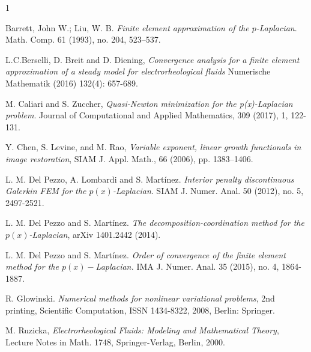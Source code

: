 \documentclass[11pt]{amsart}
\theoremstyle{remark}
\theoremstyle{definition}
\numberwithin{equation}{section}
\begin{document}
\begin{thebibliography}{1}

 {\sc Barrett, John W.; Liu, W. B}. \emph{Finite element approximation of the $p$-Laplacian}. Math. Comp. 61 (1993), no. 204, 523--537.

 {\sc L.C.Berselli, D. Breit and D. Diening}, \emph{Convergence analysis for a finite element approximation of a steady model for electrorheological fluids}
Numerische Mathematik  (2016) 132(4): 657-689.

 {\sc M. Caliari and S. Zuccher}, \emph{Quasi-Newton minimization for the p(x)-Laplacian problem}. Journal of Computational and Applied Mathematics, 309 (2017), 1, 122-131.

 {\sc Y. Chen, S. Levine, and M. Rao}, \emph{Variable exponent, linear growth functionals in image
restoration}, SIAM J. Appl. Math., 66 (2006), pp. 1383–1406.

 {\sc L. M. Del Pezzo, A. Lombardi and S. Martínez}.
\emph{Interior penalty discontinuous Galerkin FEM for the $p(x)$-Laplacian}.
SIAM J. Numer. Anal. 50 (2012), no. 5, 2497-2521.

 {\sc L. M. Del Pezzo and S. Martínez}.
\emph{The decomposition-coordination method for the $p(x)$-Laplacian}, arXiv 1401.2442 (2014).

 {\sc L. M. Del Pezzo and S. Martínez}.
\emph{Order of convergence of the finite element method for the $p(x)-$Laplacian.}
IMA J. Numer. Anal. 35 (2015), no. 4, 1864-1887.

 {\sc R. Glowinski}.
\emph{Numerical methods for nonlinear variational problems},
2nd printing, Scientific Computation, ISSN 1434-8322, 2008, Berlin: Springer.

  {\sc M. Ruzicka}, \emph{ Electrorheological Fluids: Modeling and Mathematical Theory}, Lecture Notes in
Math. 1748, Springer-Verlag, Berlin, 2000.

\end{thebibliography}
\end{document}
